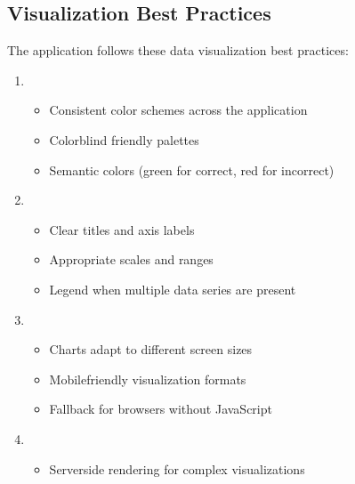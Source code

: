 \documentclass[letterpaper,10pt,english]{sphinxmanual}
\begin{document}
\subsection{Visualization Best Practices}
\label{\detokenize{analytics:visualization-best-practices}}
\sphinxAtStartPar
The application follows these data visualization best practices:
\begin{enumerate}
%
\item {} 
\sphinxAtStartPar
{}
\begin{itemize}
\item {} 
\sphinxAtStartPar
Consistent color schemes across the application

\item {} 
\sphinxAtStartPar
Color\sphinxhyphen{}blind friendly palettes

\item {} 
\sphinxAtStartPar
Semantic colors (green for correct, red for incorrect)

\end{itemize}

\item {} 
\sphinxAtStartPar
{}
\begin{itemize}
\item {} 
\sphinxAtStartPar
Clear titles and axis labels

\item {} 
\sphinxAtStartPar
Appropriate scales and ranges

\item {} 
\sphinxAtStartPar
Legend when multiple data series are present

\end{itemize}

\item {} 
\sphinxAtStartPar
{}
\begin{itemize}
\item {} 
\sphinxAtStartPar
Charts adapt to different screen sizes

\item {} 
\sphinxAtStartPar
Mobile\sphinxhyphen{}friendly visualization formats

\item {} 
\sphinxAtStartPar
Fallback for browsers without JavaScript

\end{itemize}

\item {} 
\sphinxAtStartPar
{}
\begin{itemize}
\item {} 
\sphinxAtStartPar
Server\sphinxhyphen{}side rendering for complex visualizations


\end{itemize}
\end{enumerate}
\end{document}
